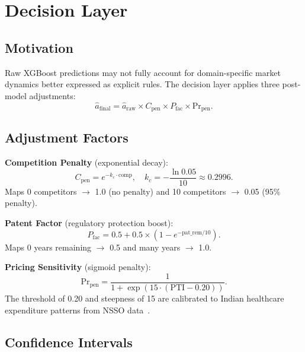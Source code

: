 \documentclass[10pt,journal,compsoc]{IEEEtran}
\begin{document}
\section{Decision Layer}
\label{sec:decision}

\subsection{Motivation}

Raw XGBoost predictions may not fully account for domain-specific market dynamics
better expressed as explicit rules.
The decision layer applies three post-model adjustments:
\begin{equation}
  \hat{a}_{\text{final}} = \hat{a}_{\text{raw}}\times C_{\text{pen}}
                           \times P_{\text{fac}}\times \text{Pr}_{\text{pen}}.
  \label{eq:decision_layer}
\end{equation}

\subsection{Adjustment Factors}

\textbf{Competition Penalty} (exponential decay):
\begin{equation}
  C_{\text{pen}} = e^{-k_c\cdot\text{comp}},\quad
  k_c = -\frac{\ln 0.05}{10}\approx 0.2996.
  \label{eq:comp_pen}
\end{equation}
Maps 0 competitors $\to$ 1.0 (no penalty) and 10 competitors $\to$ 0.05 (95\%
penalty).

\textbf{Patent Factor} (regulatory protection boost):
\begin{equation}
  P_{\text{fac}} = 0.5 + 0.5\times\!\left(1-e^{-\text{pat\_rem}/10}\right).
  \label{eq:pat_fac}
\end{equation}
Maps 0 years remaining $\to$ 0.5 and many years $\to$ 1.0.

\textbf{Pricing Sensitivity} (sigmoid penalty):
\begin{equation}
  \text{Pr}_{\text{pen}} = \frac{1}{1+\exp\!\left(15\cdot(\text{PTI}-0.20)\right)}.
  \label{eq:price_pen}
\end{equation}
The threshold of 0.20 and steepness of 15 are calibrated to Indian healthcare
expenditure patterns from NSSO data~\cite{nsso2014}.

\subsection{Confidence Intervals}
\end{document}
